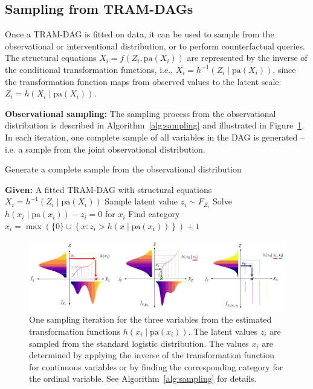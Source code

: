 \subsection{Sampling from TRAM-DAGs} \label{methods:sampling}

Once a TRAM-DAG is fitted on data, it can be used to sample from the observational or interventional distribution, or to perform counterfactual queries. The structural equations $X_i = f(Z_i, \text{pa}(X_i))$ are represented by the inverse of the conditional transformation functions, i.e., $X_i = h^{-1}(Z_i \mid \text{pa}(X_i))$, since the transformation function maps from observed values to the latent scale: $Z_i = h(X_i \mid \text{pa}(X_i))$.


\medskip

\textbf{Observational sampling:} The sampling process from the observational distribution is described in Algorithm~\ref{alg:sampling} and illustrated in Figure~\ref{fig:sampling}. In each iteration, one complete sample of all variables in the DAG is generated -- i.e. a sample from the joint observational distribution.

\begin{algorithm}
\caption{Generate a complete sample from the observational distribution}
\label{alg:sampling}
\begin{algorithmic}
\State \textbf{Given:} A fitted TRAM-DAG with structural equations $X_i = h^{-1}(Z_i \mid \text{pa}(X_i))$
  \State Sample latent value $z_i \sim F_{Z_i}$ 
    \State Solve $h(x_i \mid \text{pa}(x_i)) - z_i = 0$ for $x_i$ 
    \State Find category $x_i = \max \left( \{0\} \cup \left\{ x : z_i > h(x \mid \text{pa}(x_i)) \right\} \right) + 1
$
  \EndIf
\EndFor
\end{algorithmic}
\end{algorithm}


\begin{figure}[H]
\centering
\includegraphics[width=1\textwidth]{img/sampling.png}
\caption{One sampling iteration for the three variables from the estimated transformation functions $h(x_i \mid \text{pa}(x_i))$. The latent values $z_i$ are sampled from the standard logistic distribution. The values $x_i$ are determined by applying the inverse of the transformation function for continuous variables or by finding the corresponding category for the ordinal variable. See Algorithm~\ref{alg:sampling} for details.}
\label{fig:sampling}
\end{figure}


